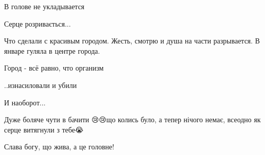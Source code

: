  
 
 
 
 

\qqSecCmt


В голове не укладывается


Серце розривається...


Что сделали с красивым городом. Жесть, смотрю и душа на части разрывается. В
январе гуляла в центре города.


Город - всё равно, что организм

..изнасиловали и убили

И наоборот...


Дуже боляче чути в бачити 😢😢що колись було, а тепер нічого немає, всеодно як
серце витягнули з тебе😭


Слава богу, що жива, а це головне!🙏🇺🇦😘
